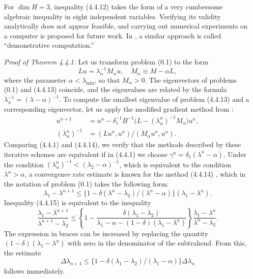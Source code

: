 \documentclass[11pt,oneside]{book}
\begin{document}
For $\dim H = 3$, inequality (4.4.12) takes the form of a very cumbersome algebraic inequality in eight independent variables. Verifying its validity analytically does not appear feasible, and carrying out numerical experiments on a computer is proposed for future work. In \citep{Babenko1985}, a similar approach is called ``demonstrative computation.''

\textit{Proof of Theorem 4.4.1.} Let us transform problem (0.1) to the form
\[
Lu = \lambda_\alpha^{-1} M_\alpha u, \quad M_\alpha \equiv M - \alpha L, \tag{4.4.13}
\]
where the parameter $\alpha < \lambda_{\min}$, so that $M_\alpha > 0$. The eigenvectors of problems (0.1) and (4.4.13) coincide, and the eigenvalues are related by the formula $\lambda_\alpha^{-1} = (\lambda - \alpha)^{-1}$. To compute the smallest eigenvalue of problem (4.4.13) and a corresponding eigenvector, let us apply the modified gradient method from \citep{DyakonovOrekhov1980}:
\[
\begin{aligned}
u^{n+1} &= u^n - \delta_1^{-1} B^{-1}\bigl(L - (\lambda_\alpha^n)^{-1} M_\alpha\bigr) u^n, \\
(\lambda_\alpha^n)^{-1} &= (L u^n, u^n) / (M_\alpha u^n, u^n).
\end{aligned} \tag{4.4.14}
\]
Comparing (4.4.1) and (4.4.14), we verify that the methods described by these iterative schemes are equivalent if in (4.4.1) we choose $\gamma^n = \delta_1(\lambda^n - \alpha)$. Under the condition $(\lambda_\alpha^n)^{-1} < (\lambda_2 - \alpha)^{-1}$, which is equivalent to the condition $\lambda^n > \alpha$, %
a convergence rate estimate is known for the method (4.4.14) \citep{DyakonovOrekhov1980}, which in the notation of problem (0.1) takes the following form:
\[
\lambda_1 - \lambda^{n+1} \leqslant \bigl\{1 - \delta(\lambda^n - \lambda_2)/(\lambda^n - \alpha)\bigr\}(\lambda_1 - \lambda^n). \tag{4.4.15}
\]
Inequality (4.4.15) is equivalent to the inequality
\[
\frac{\lambda_1 - \lambda^{n+1}}{\lambda^{n+1} - \lambda_2} \leqslant \left\{1 - \frac{\delta(\lambda_1 - \lambda_2)}{\lambda_1 - \alpha - (1 - \delta)(\lambda_1 - \lambda^n)}\right\} \frac{\lambda_1 - \lambda^n}{\lambda^n - \lambda_2}.
\]
The expression in braces can be increased by replacing the quantity $(1 - \delta)(\lambda_1 - \lambda^n)$ with zero in the denominator of the subtrahend. From this,
the estimate
\[
\Delta\lambda_{n+1} \leqslant \bigl\{1 - \delta(\lambda_1 - \lambda_2)/(\lambda_1 - \alpha)\bigr\} \Delta\lambda_n \tag{4.4.16}
\]
follows immediately.
\end{document}
